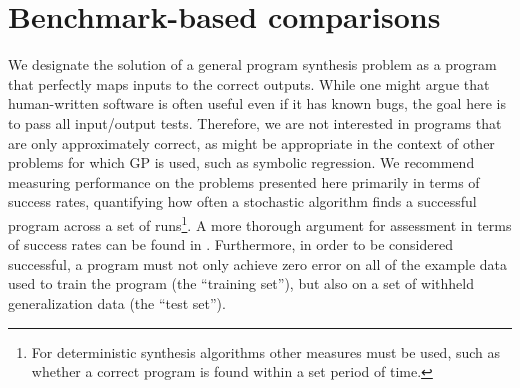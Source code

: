 \documentclass{sig-alternate}
\begin{document}




\section{Benchmark-based comparisons}


We designate the solution of a general program synthesis problem as a program that perfectly maps inputs to the correct outputs. While one might argue that human-written software is often useful even if it has known bugs, the goal here is to pass all input/output tests. Therefore, we are not interested in programs that are only approximately correct, as might be appropriate in the context of other problems for which GP is used, such as symbolic regression. We recommend measuring performance on the problems presented here primarily in terms of success rates, quantifying how often a stochastic algorithm finds a successful program across a set of runs\footnote{For deterministic synthesis algorithms other measures must be used, such as whether a correct program is found within a set period of time.}. A more thorough argument for assessment in terms of success rates can be found in \cite{Helmuth:2014:GECCO}.
Furthermore, in order to be considered successful, a program must not only achieve zero error on all of the example data used to train the program (the ``training set''), but also on a set of withheld generalization data (the ``test set''). 
\end{document}
